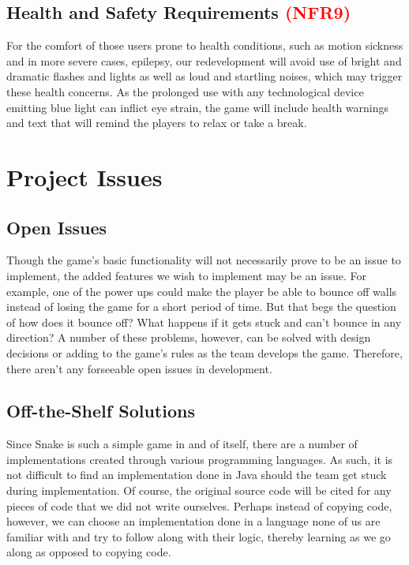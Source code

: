 \documentclass[12pt, titlepage]{article}
\begin{document}
\subsection{Health and Safety Requirements \textcolor{red}{(\textbf{NFR9})}\label{NFR9}}
For the comfort of those users prone to health conditions, such as motion sickness and in more severe cases, epilepsy, our redevelopment will avoid use of bright and dramatic flashes and lights as well as loud and startling noises, which may trigger these health concerns. As the prolonged use with any technological device emitting blue light can inflict eye strain, the game will include health warnings and text that will remind the players to relax or take a break.

\section{Project Issues}

\subsection{Open Issues}
Though the game's basic functionality will not necessarily prove to be an issue to implement, the added features we wish to implement may be an issue. For example, one of the power ups could make the player be able to bounce off walls instead of losing the game for a short period of time. But that begs the question of how does it bounce off? What happens if it gets stuck and can't bounce in any direction? A number of these problems, however, can be solved with design decisions or adding to the game's rules as the team develops the game. Therefore, there aren't any forseeable open issues in development.

\subsection{Off-the-Shelf Solutions}
Since Snake is such a simple game in and of itself, there are a number of implementations created through various programming languages. As such, it is not difficult to find an implementation done in Java should the team get stuck during implementation. Of course, the original source code will be cited for any pieces of code that we did not write ourselves. Perhaps instead of copying code, however, we can choose an implementation done in a language none of us are familiar with and try to follow along with their logic, thereby learning as we go along as opposed to copying code.
\end{document}
